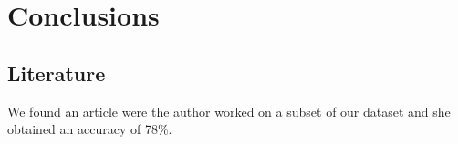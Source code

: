 \chapter{Conclusions}

\section{Literature}

We found an article \cite{womansarticle} were the author worked on a subset of our dataset and she obtained an accuracy of 78\%.